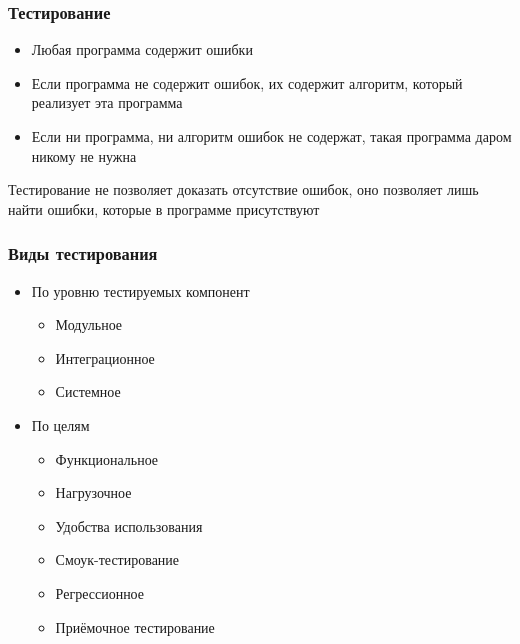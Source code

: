 \documentclass{../../slides-style}
\begin{document}
    
    \begin{frame}[plain]
        \titlepage
    \end{frame}
    
    \begin{frame}
        \frametitle{Тестирование}
        \begin{itemize}
            \item Любая программа содержит ошибки
            \item Если программа не содержит ошибок, их содержит алгоритм, который реализует эта программа
            \item Если ни программа, ни алгоритм ошибок не содержат, такая программа даром никому не нужна
        \end{itemize}
        \vspace{1cm}
        Тестирование не позволяет доказать отсутствие ошибок, оно позволяет лишь найти ошибки, которые в программе присутствуют
    \end{frame}

    \begin{frame}
        \frametitle{Виды тестирования}
        \begin{itemize}
            \item По уровню тестируемых компонент
            \begin{itemize}
                \item Модульное
                \item Интеграционное
                \item Системное
            \end{itemize}
            \item По целям
            \begin{itemize}
                \item Функциональное
                \item Нагрузочное
                \item Удобства использования
                \item Смоук-тестирование
                \item Регрессионное
                \item Приёмочное тестирование
            \end{itemize}
        \end{itemize}
    \end{frame}
\end{document}
